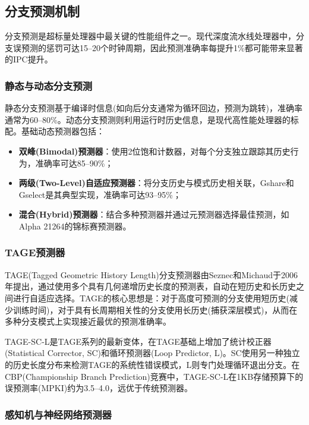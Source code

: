 \documentclass[12pt,a4paper]{IEEEtran}
\begin{document}
\subsection{分支预测机制}

分支预测是超标量处理器中最关键的性能组件之一。现代深度流水线处理器中，分支误预测的惩罚可达15--20个时钟周期，因此预测准确率每提升1\%都可能带来显著的IPC提升\cite{seznec2016tage}。

\subsubsection{静态与动态分支预测}

静态分支预测基于编译时信息(如向后分支通常为循环回边，预测为跳转)，准确率通常为60--80\%。动态分支预测则利用运行时历史信息，是现代高性能处理器的标配。基础动态预测器包括：
\begin{itemize}
\item \textbf{双峰(Bimodal)预测器}：使用2位饱和计数器，对每个分支独立跟踪其历史行为，准确率可达85--90\%；
\item \textbf{两级(Two-Level)自适应预测器}：将分支历史与模式历史相关联，Gshare和Gselect是其典型实现，准确率可达93--95\%；
\item \textbf{混合(Hybrid)预测器}：结合多种预测器并通过元预测器选择最佳预测，如Alpha 21264的锦标赛预测器\cite{kessler1999alpha21264}。
\end{itemize}

\subsubsection{TAGE预测器}

TAGE(Tagged Geometric History Length)分支预测器由Seznec和Michaud于2006年提出，通过使用多个具有几何递增历史长度的预测表，自动在短历史和长历史之间进行自适应选择\cite{seznec2006tage}。TAGE的核心思想是：对于高度可预测的分支使用短历史(减少训练时间)，对于具有长周期相关性的分支使用长历史(捕获深层模式)，从而在多种分支模式上实现接近最优的预测准确率。

TAGE-SC-L是TAGE系列的最新变体，在TAGE基础上增加了统计校正器(Statistical Corrector, SC)和循环预测器(Loop Predictor, L)\cite{seznec2016tage}。SC使用另一种独立的历史长度分布来检测TAGE的系统性错误模式，L则专门处理循环退出分支。在CBP(Championship Branch Prediction)竞赛中，TAGE-SC-L在1KB存储预算下的误预测率(MPKI)约为3.5--4.0，远优于传统预测器。

\subsubsection{感知机与神经网络预测器}
\end{document}
